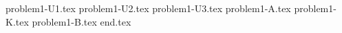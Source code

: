 \documentclass{../../../../style/mkimain}
\begin{document}
{problem1-U1.tex}
{problem1-U2.tex}
{problem1-U3.tex}
{problem1-A.tex}
{problem1-K.tex}
{problem1-B.tex}
{end.tex}
\end{document}
